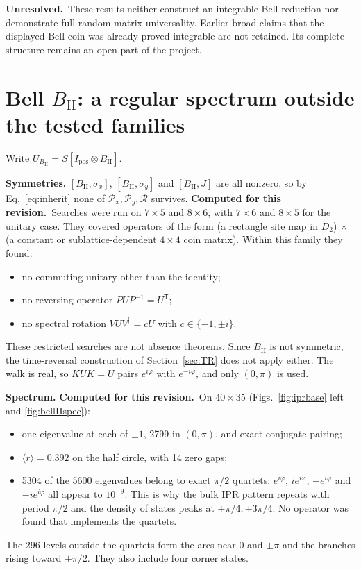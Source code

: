 \documentclass[11pt,a4paper,oneside]{report}
\newcommand{\Id}{I}
\newcommand{\open}{\textbf{Unresolved.}\ }
\newcommand{\session}{\textbf{Computed for this revision.}\ }
\numberwithin{equation}{chapter}
\begin{document}
\open These results neither construct an integrable Bell reduction
nor demonstrate full random-matrix universality. Earlier broad claims
that the displayed Bell coin was already proved integrable are not
retained. Its complete structure remains an open part of the project.

\section{Bell \(B_{\mathrm{II}}\): a regular spectrum outside the tested families}
\label{sec:bellIIfull}

Write \(U_{B_{\mathrm{II}}}=S[\Id_{\mathrm{pos}}\otimes B_{\mathrm{II}}]\).

\textbf{Symmetries.} \([B_{\mathrm{II}},\sigma_x]\), \([B_{\mathrm{II}},\sigma_y]\)
and \([B_{\mathrm{II}},J]\) are all nonzero, so by Eq.~\eqref{eq:inherit}
none of \(\mathcal P_x,\mathcal P_y,\mathcal R\) survives.
\session Searches were run on \(7\times5\) and \(8\times6\), with
\(7\times6\) and \(8\times5\) for the unitary case. They covered
operators of the form (a rectangle site map in \(D_2\)) \(\times\) (a
constant or sublattice-dependent \(4\times4\) coin matrix). Within this
family they found:
\begin{itemize}
\item no commuting unitary other than the identity;
\item no reversing operator \(PUP^{-1}=U^{\mathsf T}\);
\item no spectral rotation \(VUV^\dagger=cU\) with \(c\in\{-1,\pm i\}\).
\end{itemize}
These restricted searches are not absence theorems. Since
\(B_{\mathrm{II}}\) is not symmetric, the time-reversal construction of
Section~\ref{sec:TR} does not apply either. The walk is real, so
\(KUK=U\) pairs \(e^{i\varphi}\) with \(e^{-i\varphi}\), and only
\((0,\pi)\) is used.

\textbf{Spectrum.} \session On \(40\times35\) (Figs.~\ref{fig:iprbase}
left and \ref{fig:bellIIspec}):
\begin{itemize}
\item one eigenvalue at each of \(\pm1\), 2799 in \((0,\pi)\), and exact
conjugate pairing;
\item \(\langle r\rangle=0.392\) on the half circle, with 14 zero gaps;
\item 5304 of the 5600 eigenvalues belong to exact \(\pi/2\) quartets:
\(e^{i\varphi}\), \(ie^{i\varphi}\), \(-e^{i\varphi}\) and
\(-ie^{i\varphi}\) all appear to \(10^{-9}\). This is why the bulk IPR
pattern repeats with period \(\pi/2\) and the density of states peaks at
\(\pm\pi/4,\pm3\pi/4\). No operator was found that implements the
quartets.
\end{itemize}
The 296 levels outside the quartets form the arcs near \(0\) and \(\pm\pi\)
and the branches rising toward \(\pm\pi/2\). They also include four
corner states.
\end{document}
